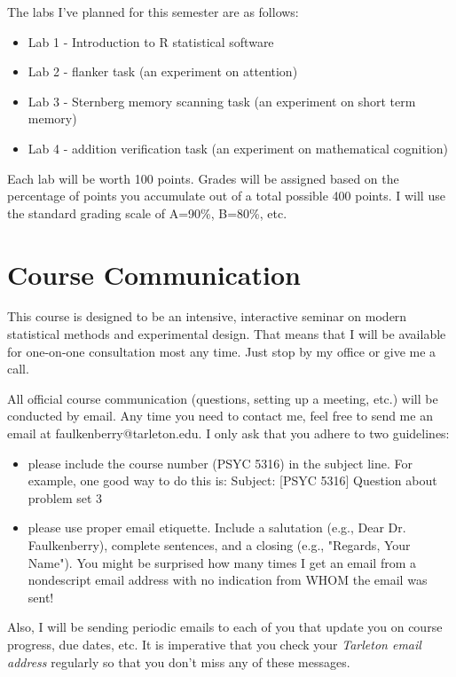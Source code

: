 \documentclass[10pt]{article}
\begin{document}
The labs I've planned for this semester are as follows:

\begin{itemize}
\item Lab 1 - Introduction to R statistical software
\item Lab 2 - flanker task (an experiment on attention)
\item Lab 3 - Sternberg memory scanning task (an experiment on short term memory)
\item Lab 4 - addition verification task (an experiment on mathematical cognition)
\end{itemize}

Each lab will be worth 100 points. Grades will be assigned based on the percentage of points you accumulate out of a total possible 400 points.  I will use the standard grading scale of A=90\%, B=80\%, etc.

\section*{Course Communication}
\label{sec:orgc4ac323}

This course is designed to be an intensive, interactive seminar on modern statistical methods and experimental design.  That means that I will be available for one-on-one consultation most any time.  Just stop by my office or give me a call.

All official course communication (questions, setting up a meeting, etc.) will be conducted by email.  Any time you need to contact me, feel free to send me an email at faulkenberry@tarleton.edu.  I only ask that you adhere to two guidelines:
\begin{itemize}
\item please include the course number (PSYC 5316) in the subject line.  For example, one good way to do this is:  Subject: [PSYC 5316] Question about problem set 3
\item please use proper email etiquette.  Include a salutation (e.g., Dear Dr. Faulkenberry), complete sentences, and a closing (e.g., "Regards, Your Name").  You might be surprised how many times I get an email from a nondescript email address with no indication from WHOM the email was sent!
\end{itemize}

Also, I will be sending periodic emails to each of you that update you on course progress, due dates, etc.  It is imperative that you check your \emph{Tarleton email address} regularly so that you don't miss any of these messages.
\end{document}
